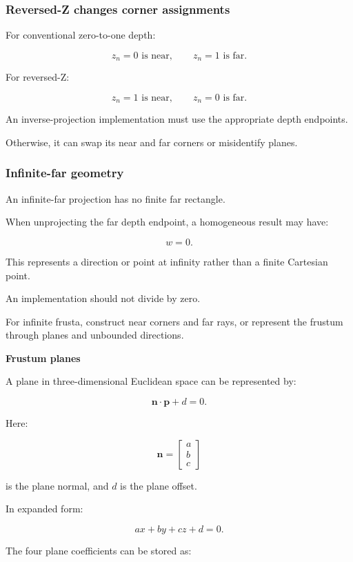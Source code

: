 \subsubsection{Reversed-Z changes corner assignments}\label{reversed-z-changes-corner-assignments}

For conventional zero-to-one depth:

\[
 z_n=0 \text{ is near},\qquad z_n=1 \text{ is far}.
\]

For reversed-Z:

\[
 z_n=1 \text{ is near},\qquad z_n=0 \text{ is far}.
\]

An inverse-projection implementation must use the appropriate depth endpoints.

Otherwise, it can swap its near and far corners or misidentify planes.

\subsubsection{Infinite-far geometry}\label{infinite-far-geometry}

An infinite-far projection has no finite far rectangle.

When unprojecting the far depth endpoint, a homogeneous result may have:

\[
 w=0.
\]

This represents a direction or point at infinity rather than a finite Cartesian point.

An implementation should not divide by zero.

For infinite frusta, construct near corners and far rays, or represent the frustum through planes and unbounded directions.

\textbf{Frustum planes}

A plane in three-dimensional Euclidean space can be represented by:

\[
 \boxed{ \mathbf n\cdot\mathbf p+d=0 }.
\]

Here:

\[
 \mathbf n= \begin{bmatrix}a\\b\\c\end{bmatrix}
\]

is the plane normal, and \(d\) is the plane offset.

In expanded form:

\[
 \boxed{ ax+by+cz+d=0 }.
\]

The four plane coefficients can be stored as:

